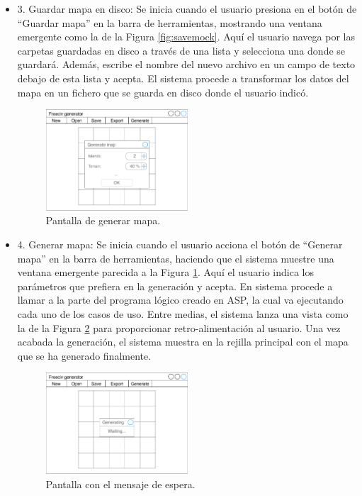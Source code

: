 \begin{itemize}
	\item 3. Guardar mapa en disco: Se inicia cuando el usuario presiona en el botón de ``Guardar mapa'' en la barra de herramientas, mostrando una ventana emergente como la de la Figura \ref{fig:savemock}. Aquí el usuario navega por las carpetas guardadas en disco a través de una lista y selecciona una donde se guardará. Además, escribe el nombre del nuevo archivo en un campo de texto debajo de esta lista y acepta. El sistema procede a transformar los datos del mapa en un fichero que se guarda en disco donde el usuario indicó.
	
	\begin{figure}[!h]
		\centering
		\includegraphics[width=0.5\textwidth]{images/generate-map.pdf}
		\caption{Pantalla de generar mapa.}
		\label{fig:generatemock}
	\end{figure}
	
	\item 4. Generar mapa: Se inicia cuando el usuario acciona el botón de ``Generar mapa'' en la barra de herramientas, haciendo que el sistema muestre una ventana emergente parecida a la Figura \ref{fig:generatemock}. Aquí el usuario indica los parámetros que prefiera en la generación y acepta. En sistema procede a llamar a la parte del programa lógico creado en ASP, la cual va ejecutando cada uno de los casos de uso. Entre medias, el sistema lanza una vista como la de la Figura \ref{fig:waitingmock} para proporcionar retro-alimentación al usuario. Una vez acabada la generación, el sistema muestra en la rejilla principal con el mapa que se ha generado finalmente.

	\begin{figure}[!h]
		\centering
		\includegraphics[width=0.5\textwidth]{images/waiting-mock.pdf}
		\caption{Pantalla con el mensaje de espera.}
		\label{fig:waitingmock}
	\end{figure}
	

\end{itemize}
